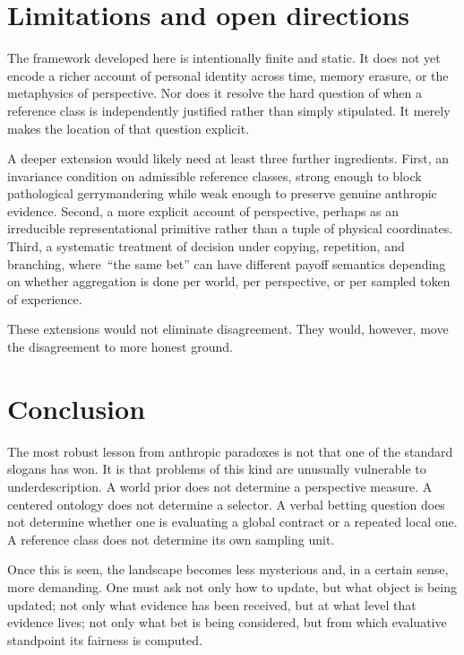 \documentclass[11pt]{article}
\newcommand{\1}{\mathbf{1}}
\begin{document}
\section{Limitations and open directions}

The framework developed here is intentionally finite and static. It does not yet encode a richer account of personal identity across time, memory erasure, or the metaphysics of perspective. Nor does it resolve the hard question of when a reference class is independently justified rather than simply stipulated. It merely makes the location of that question explicit.

A deeper extension would likely need at least three further ingredients. First, an invariance condition on admissible reference classes, strong enough to block pathological gerrymandering while weak enough to preserve genuine anthropic evidence. Second, a more explicit account of perspective, perhaps as an irreducible representational primitive rather than a tuple of physical coordinates. Third, a systematic treatment of decision under copying, repetition, and branching, where \,``the same bet'' can have different payoff semantics depending on whether aggregation is done per world, per perspective, or per sampled token of experience.

These extensions would not eliminate disagreement. They would, however, move the disagreement to more honest ground.

\section{Conclusion}

The most robust lesson from anthropic paradoxes is not that one of the standard slogans has won. It is that problems of this kind are unusually vulnerable to underdescription. A world prior does not determine a perspective measure. A centered ontology does not determine a selector. A verbal betting question does not determine whether one is evaluating a global contract or a repeated local one. A reference class does not determine its own sampling unit.

Once this is seen, the landscape becomes less mysterious and, in a certain sense, more demanding. One must ask not only how to update, but what object is being updated; not only what evidence has been received, but at what level that evidence lives; not only what bet is being considered, but from which evaluative standpoint its fairness is computed.
\end{document}
